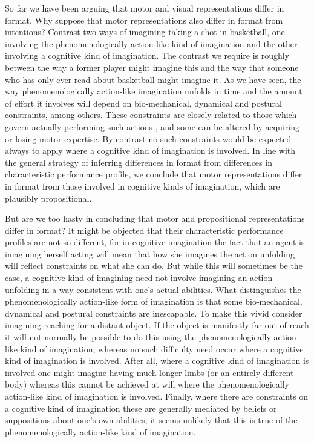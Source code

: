 \documentclass[12pt,\papersize]{extarticle}
\begin{document}
So far we have been arguing that motor and visual representations differ in format.  Why suppose that motor representations also differ in format from intentions?  Contrast two ways of imagining taking a shot in basketball, one involving the phenomenologically action-like kind of imagination and the other involving a cognitive kind of imagination.  The contrast we require is roughly between the way a former player might imagine this and the way that someone who has only ever read about basketball might imagine it.  As we have seen, the way phenomenologically action-like imagination unfolds in time and the amount of effort it involves will depend on bio-mechanical, dynamical and postural constraints, among others. These constraints are closely related to those which govern actually performing such actions \citep{Jeannerod:2001yb}, and some can be altered by acquiring or losing motor expertise.  By contrast no such constraints would be expected always to apply where a cognitive kind of imagination is involved.  In line with the general strategy of inferring differences in format from differences in characteristic performance profile, we conclude that motor representations differ in format from those involved in cognitive kinds of imagination, which are plausibly propositional.

But are we too hasty in concluding that motor and propositional representations differ in format?  It might be objected that their characteristic performance profiles are not so different, for in cognitive imagination the fact that an agent is imagining herself acting will mean that how she imagines the action unfolding will reflect constraints on what she can do. But while this will sometimes be the case, a cognitive kind of imagining need not involve imagining an action unfolding in a way consistent with one's actual abilities. What distinguishes the phenomenologically action-like form of imagination is that some bio-mechanical, dynamical and postural constraints are inescapable.  To make this vivid consider imagining reaching for a distant object.  If the object is manifestly far out of reach it will not normally be possible to do this using the phenomenologically action-like kind of imagination, whereas no such difficulty need occur where a cognitive kind of imagination is involved.  After all, where a cognitive kind of imagination is involved one might imagine having much longer limbs (or an entirely different body) whereas this cannot be achieved at will where the phenomenologically action-like kind of imagination is involved.  Finally, where there are constraints on a cognitive kind of imagination these are generally mediated by beliefs or suppositions about one's own abilities; it seems unlikely that this is true of the phenomenologically action-like kind of imagination.
\end{document}
